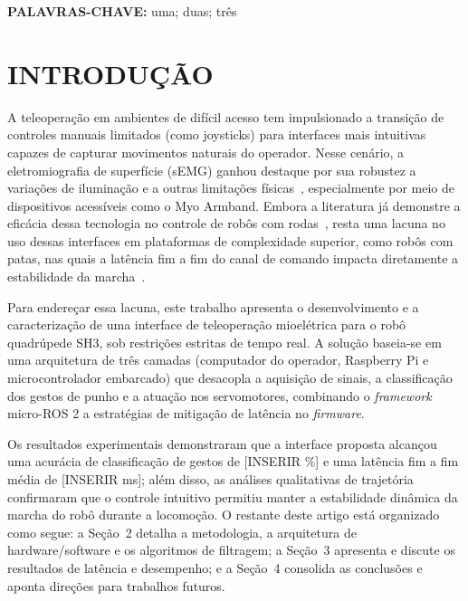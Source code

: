 \documentclass[12pt,a4paper]{article}
\newenvironment{bloco}
  {\setlength{\topsep}{0pt}\setlength{\partopsep}{0pt}\begin{center}}
  {\end{center}}
\begin{document}
\begin{bloco}
    \textbf{PALAVRAS-CHAVE:} uma; duas; três
\end{bloco}

\vspace{1pt}

\section{INTRODUÇÃO}

A teleoperação em ambientes de difícil acesso tem impulsionado a
transição de controles manuais limitados (como joysticks) para
interfaces mais intuitivas capazes de capturar movimentos naturais do
operador. Nesse cenário, a eletromiografia de superfície (sEMG) ganhou
destaque por sua robustez a variações de iluminação e a outras
limitações físicas~\cite{sultana2023systematic}, especialmente por meio
de dispositivos acessíveis como o Myo Armband. Embora a literatura já demonstre a
eficácia dessa tecnologia no controle de robôs com
rodas~\cite{sathiyanarayanan2015controlling,morais2016application},
resta uma lacuna no uso dessas interfaces em plataformas de
complexidade superior, como robôs com patas, nas quais a latência fim a
fim do canal de comando impacta diretamente a estabilidade da
marcha~\cite{risiglione2021passivity}.

Para endereçar essa lacuna, este trabalho apresenta o desenvolvimento e a
caracterização de uma interface de teleoperação mioelétrica para o robô
quadrúpede SH3, sob restrições estritas de tempo real. A
solução baseia-se em uma arquitetura de três camadas (computador do operador,
Raspberry Pi e microcontrolador embarcado) que desacopla a aquisição de
sinais, a classificação dos gestos de punho e a atuação nos servomotores, combinando o
\textit{framework} micro-ROS 2 a estratégias de mitigação de latência no
\textit{firmware}.

Os resultados experimentais demonstraram que a interface proposta alcançou uma
acurácia de classificação de gestos de [INSERIR \%] e uma latência fim a fim
média de [INSERIR ms]; além disso, as análises qualitativas de trajetória confirmaram que
o controle intuitivo permitiu manter a estabilidade dinâmica da marcha do
robô durante a locomoção. O restante deste artigo está organizado como segue:
a Seção~2 detalha a metodologia, a arquitetura de hardware/software e os
algoritmos de filtragem; a Seção~3 apresenta e discute os resultados de
latência e desempenho; e a Seção~4 consolida as conclusões e aponta direções
para trabalhos futuros.
\end{document}
